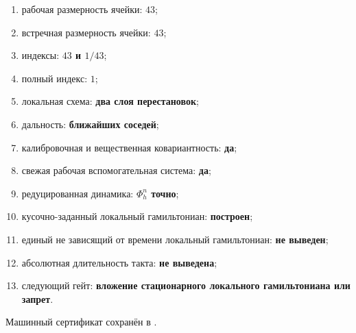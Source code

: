 \begin{protocol}
\begin{enumerate}
 \item рабочая размерность ячейки: \textbf{$43$};
 \item встречная размерность ячейки: \textbf{$43$};
 \item индексы: \textbf{$43$ и $1/43$};
 \item полный индекс: \textbf{$1$};
 \item локальная схема: \textbf{два слоя перестановок};
 \item дальность: \textbf{ближайших соседей};
 \item калибровочная и вещественная ковариантность: \textbf{да};
 \item свежая рабочая вспомогательная система: \textbf{да};
 \item редуцированная динамика: \textbf{$\Phi_h^n$ точно};
 \item кусочно-заданный локальный гамильтониан: \textbf{построен};
 \item единый не зависящий от времени локальный гамильтониан: \textbf{не выведен};
 \item абсолютная длительность такта: \textbf{не выведена};
 \item следующий гейт: \textbf{вложение стационарного локального гамильтониана или запрет}.
\end{enumerate}
\end{protocol}

Машинный сертификат сохранён в
.